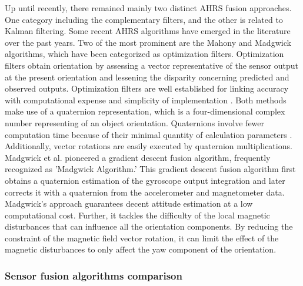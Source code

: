 Up until recently, there remained mainly two distinct AHRS fusion approaches. One category including the complementary filters, and the other is related to Kalman filtering. Some recent AHRS algorithms have emerged in the literature over the past years. Two of the most prominent are the Mahony and Madgwick algorithms, which have been categorized as optimization filters. Optimization filters obtain orientation by assessing a vector representative of the sensor output at the present orientation and lessening the disparity concerning predicted and observed outputs. Optimization filters are well established for linking accuracy with computational expense and simplicity of implementation \cite{madgwick2020extended}.
Both methods make use of a quaternion representation, which is a four-dimensional complex number representing of an object orientation. Quaternions involve fewer computation time because of their minimal quantity of calculation parameters \cite{ludwig2018comparison}. Additionally, vector rotations are easily executed by quaternion multiplications.
Madgwick et al. \cite{madgwick2010efficient} pioneered a gradient descent fusion algorithm, frequently recognized as 'Madgwick Algorithm.' This gradient descent fusion algorithm first obtains a quaternion estimation of the gyroscope output integration and later corrects it with a quaternion from the accelerometer and magnetometer data. Madgwick's approach guarantees decent attitude estimation at a low computational cost. Further, it tackles the difficulty of the local magnetic disturbances that can influence all the orientation components. By reducing the constraint of the magnetic field vector rotation, it can limit the effect of the magnetic disturbances to only affect the yaw component of the orientation.

\subsubsection{Sensor fusion algorithms comparison}


